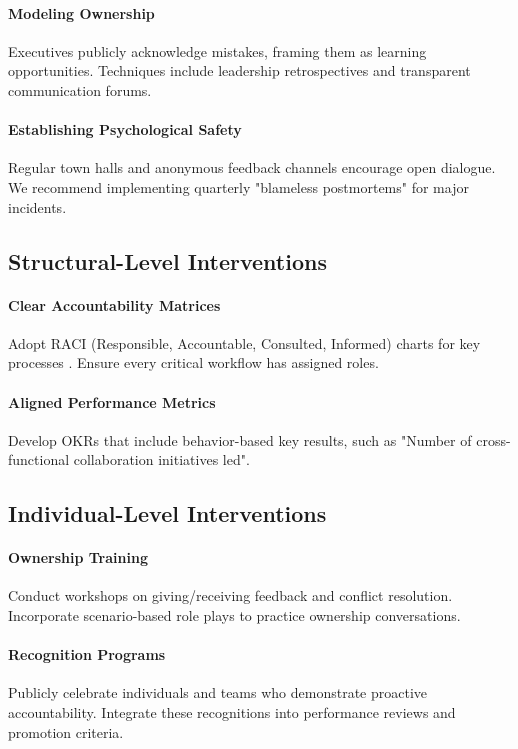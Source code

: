 \documentclass[11pt,a4paper]{article}
\begin{document}
\paragraph{Modeling Ownership} Executives publicly acknowledge mistakes, framing them as learning opportunities. Techniques include leadership retrospectives and transparent communication forums.

\paragraph{Establishing Psychological Safety} Regular town halls and anonymous feedback channels encourage open dialogue. We recommend implementing quarterly "blameless postmortems" for major incidents.

\subsection{Structural-Level Interventions}
\paragraph{Clear Accountability Matrices} Adopt RACI (Responsible, Accountable, Consulted, Informed) charts for key processes \cite{PMI2013}. Ensure every critical workflow has assigned roles.

\paragraph{Aligned Performance Metrics} Develop OKRs that include behavior-based key results, such as "Number of cross-functional collaboration initiatives led".

\subsection{Individual-Level Interventions}
\paragraph{Ownership Training} Conduct workshops on giving/receiving feedback and conflict resolution. Incorporate scenario-based role plays to practice ownership conversations.

\paragraph{Recognition Programs} Publicly celebrate individuals and teams who demonstrate proactive accountability. Integrate these recognitions into performance reviews and promotion criteria.
\end{document}
